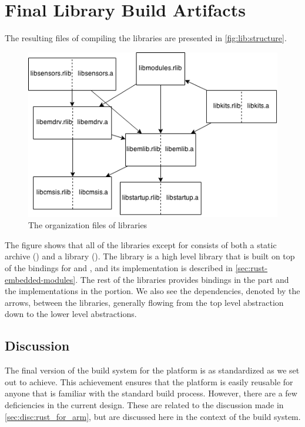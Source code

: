 \section{Final Library Build Artifacts}

The resulting files of compiling the libraries are presented in \autoref{fig:lib:structure}.

\begin{figure}[H]
  \begin{center}
    \includegraphics[scale=0.5]{figures/lib-structure.png}
  \end{center}
  \caption{The organization files of libraries}
  \label{fig:lib:structure}
\end{figure}

The figure shows that all of the libraries except for  consists of both a {\C} static archive () and a {\rust} library ().
The  library is a high level library that is built on top of the bindings for {\emlib} and {\emdrv}, and its implementation is described in \autoref{sec:rust-embedded-modules}.
The rest of the libraries provides {\rust} bindings in the  part and the {\C} implementations in the  portion.
We also see the dependencies, denoted by the arrows, between the libraries, generally flowing from the top level abstraction down to the lower level abstractions.

\subsection{Discussion}

The final version of the build system for the {\rg} platform is as standardized as we set out to achieve.
This achievement ensures that the platform is easily reusable for anyone that is familiar with the standard {\cargo} build process.
However, there are a few deficiencies in the current design.
These are related to the discussion made in \autoref{sec:disc:rust_for_arm}, but are discussed here in the context of the build system.

